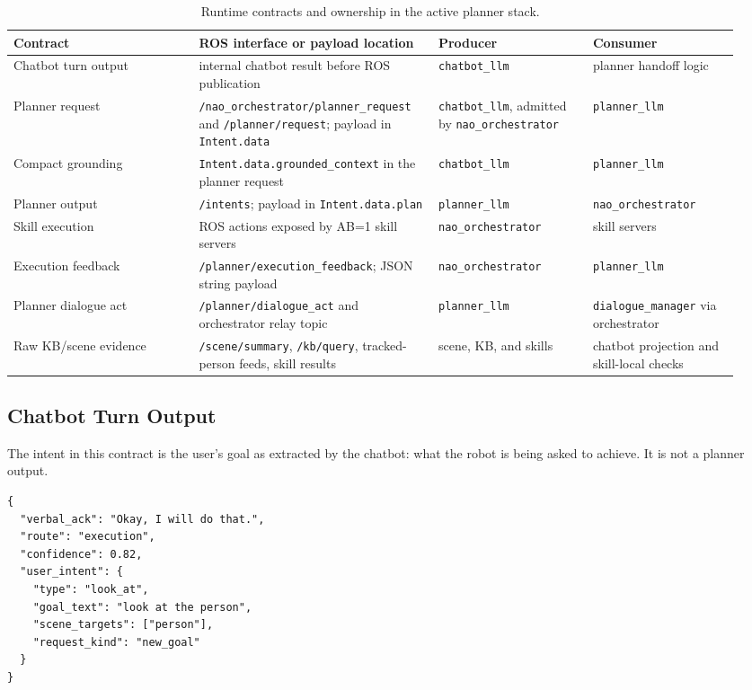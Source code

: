 \documentclass[12pt,a4paper]{article}
\newcommand{\code}[1]{\texttt{#1}}
\begin{document}
\begin{longtable}{p{0.24\linewidth}p{0.31\linewidth}p{0.20\linewidth}p{0.19\linewidth}}
\caption{Runtime contracts and ownership in the active planner stack.}\label{tab:corrected-contract-map}\\
\toprule
Contract & ROS interface or payload location & Producer & Consumer\\
\midrule
Chatbot turn output & internal chatbot result before ROS publication & \code{chatbot\_llm} & planner handoff logic\\
Planner request & \code{/nao\_orchestrator/planner\_request} and \code{/planner/request}; payload in \code{Intent.data} & \code{chatbot\_llm}, admitted by \code{nao\_orchestrator} & \code{planner\_llm}\\
Compact grounding & \code{Intent.data.grounded\_context} in the planner request & \code{chatbot\_llm} & \code{planner\_llm}\\
Planner output & \code{/intents}; payload in \code{Intent.data.plan} & \code{planner\_llm} & \code{nao\_orchestrator}\\
Skill execution & ROS actions exposed by AB=1 skill servers & \code{nao\_orchestrator} & skill servers\\
Execution feedback & \code{/planner/execution\_feedback}; JSON string payload & \code{nao\_orchestrator} & \code{planner\_llm}\\
Planner dialogue act & \code{/planner/dialogue\_act} and orchestrator relay topic & \code{planner\_llm} & \code{dialogue\_manager} via orchestrator\\
Raw KB/scene evidence & \code{/scene/summary}, \code{/kb/query}, tracked-person feeds, skill results & scene, KB, and skills & chatbot projection and skill-local checks\\
\bottomrule
\end{longtable}

\subsection{Chatbot Turn Output}

The intent in this contract is the user's goal as extracted by the chatbot: what the robot is being asked to achieve. It is not a planner output.

\begin{lstlisting}
{
  "verbal_ack": "Okay, I will do that.",
  "route": "execution",
  "confidence": 0.82,
  "user_intent": {
    "type": "look_at",
    "goal_text": "look at the person",
    "scene_targets": ["person"],
    "request_kind": "new_goal"
  }
}
\end{lstlisting}
\end{document}
